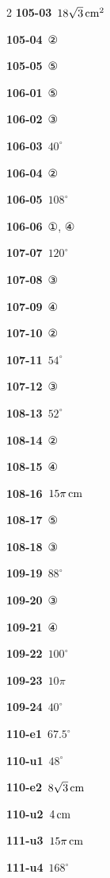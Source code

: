 \documentclass[10pt,a4paper]{article}
\begin{document}
\begin{multicols}{2}
\noindent\textbf{105-03}\ $18\sqrt{3}\mkern3mu \mathrm{cm}^2$\par
\noindent\textbf{105-04}\ ②\par
\noindent\textbf{105-05}\ ⑤\par
\noindent\textbf{106-01}\ ⑤\par
\noindent\textbf{106-02}\ ③\par
\noindent\textbf{106-03}\ $40^\circ$\par
\noindent\textbf{106-04}\ ②\par
\noindent\textbf{106-05}\ $108^\circ$\par
\noindent\textbf{106-06}\ ①, ④\par
\noindent\textbf{107-07}\ $120^\circ$\par
\noindent\textbf{107-08}\ ③\par
\noindent\textbf{107-09}\ ④\par
\noindent\textbf{107-10}\ ②\par
\noindent\textbf{107-11}\ $54^\circ$\par
\noindent\textbf{107-12}\ ③\par
\noindent\textbf{108-13}\ $52^\circ$\par
\noindent\textbf{108-14}\ ②\par
\noindent\textbf{108-15}\ ④\par
\noindent\textbf{108-16}\ $15\pi\mkern3mu \mathrm{cm}$\par
\noindent\textbf{108-17}\ ⑤\par
\noindent\textbf{108-18}\ ③\par
\noindent\textbf{109-19}\ $88^\circ$\par
\noindent\textbf{109-20}\ ③\par
\noindent\textbf{109-21}\ ④\par
\noindent\textbf{109-22}\ $100^\circ$\par
\noindent\textbf{109-23}\ $10\pi$\par
\noindent\textbf{109-24}\ $40^\circ$\par
\noindent\textbf{110-e1}\ $67.5^\circ$\par
\noindent\textbf{110-u1}\ $48^\circ$\par
\noindent\textbf{110-e2}\ $8\sqrt{3}\mkern3mu \mathrm{cm}$\par
\noindent\textbf{110-u2}\ $4\mkern3mu \mathrm{cm}$\par
\noindent\textbf{111-u3}\ $15\pi\mkern3mu \mathrm{cm}$\par
\noindent\textbf{111-u4}\ $168^\circ$\par

\end{multicols}
\end{document}
